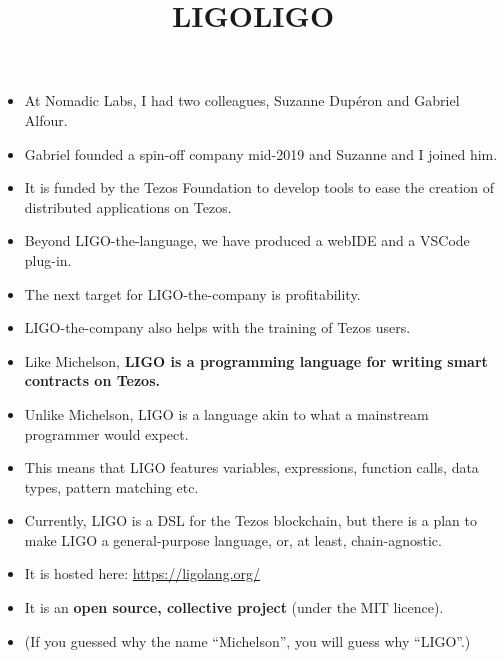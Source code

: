 \documentclass[wide]{slides}
\begin{document}
\begin{slide}
  \title{LIGO}

  \begin{itemize}

    \item At Nomadic Labs, I had two colleagues, Suzanne Dupéron and
      Gabriel Alfour.

    \item Gabriel founded a spin-off company mid-2019 and Suzanne and
      I joined him.

    \item It is funded by the Tezos Foundation to develop tools to
      ease the creation of distributed applications on Tezos.

    \item Beyond LIGO-the-language, we have produced a webIDE and a
      VSCode plug-in.

    \item The next target for LIGO-the-company is profitability.

    \item LIGO-the-company also helps with the training of Tezos
      users.

  \end{itemize}

\end{slide}

\begin{slide}
  \title{LIGO}

  \begin{itemize}

    \item Like Michelson, \textbf{LIGO is a programming language for
      writing smart contracts on Tezos.}

    \item Unlike Michelson, LIGO is a language akin to what a
      mainstream programmer would expect.

    \item This means that LIGO features variables, expressions,
      function calls, data types, pattern matching etc.

    \item Currently, LIGO is a DSL for the Tezos blockchain, but there
      is a plan to make LIGO a general-purpose language, or, at least,
      chain-agnostic.

    \item It is hosted here: \url{https://ligolang.org/}

    \item It is an \textbf{open source, collective project} (under the
      MIT licence).

    \item (If you guessed why the name ``Michelson'', you will guess
      why ``LIGO''.)

  \end{itemize}

\end{slide}
\end{document}
